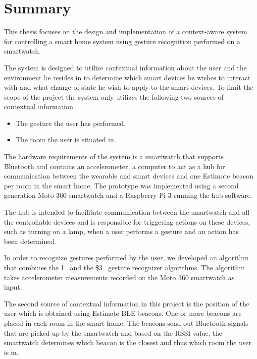 \section*{Summary}
\label{formalities:summary}

This thesis focuses on the design and implementation of a context-aware system for controlling a smart home system using gesture recognition performed on a smartwatch.

The system is designed to utilize contextual information about the user and the environment he resides in to determine which smart devices he wishes to interact with and what change of state he wish to apply to the smart devices.
To limit the scope of the project the system only utilizes the following two sources of contextual information. 

\begin{itemize}
\item The gesture the user has performed.
\item The room the user is situated in.
\end{itemize}

The hardware requirements of the system is a smartwatch that supports Bluetooth and contains an accelerometer, a computer to act as a hub for communication between the wearable and smart devices and one Estimote beacon per room in the smart home.
The prototype was implemented using a second generation Moto 360 smartwatch and a Raspberry Pi 3 running the hub software.

The hub is intended to facilitate communication between the smartwatch and all the controllable devices and is responsible for triggering actions on these devices, such as turning on a lamp, when a user performs a gesture and an action has been determined.

In order to recognize gestures performed by the user, we developed an algorithm that combines the 1\textcent~\cite{herold20121} and the \$3~\cite{threedollar} gesture recognizer algorithms. The algorithm takes accelerometer measurements recorded on the Moto 360 smartwatch as input.

The second source of contextual information in this project is the position of the user which is obtained using Estimote BLE beacons. One or more beacons are placed in each room in the smart home.
The beacons send out Bluetooth signals that are picked up by the smartwatch and based on the RSSI value, the smartwatch determines which beacon is the closest and thus which room the user is in.


